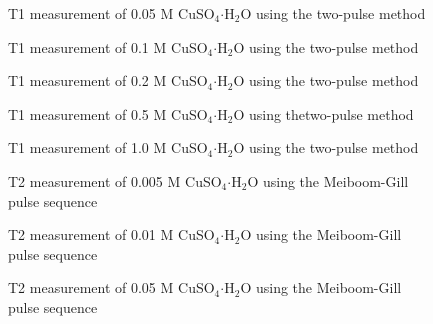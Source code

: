 \documentclass[
reprint,
amsmath,amssymb,
aps,
tikz,
border=5pt
]{revtex4-1}
\begin{document}
\begin{figure}[h]
  \resizebox{0.75\textwidth}{!}{}
  \caption{T1 measurement of 0.05 M  CuSO$_{4} \boldsymbol{\cdot} $H$_2$O using the two-pulse method }
  \label{figAp:0d05_t1}
\end{figure}

\begin{figure}[h]
  \resizebox{0.75\textwidth}{!}{}
  \caption{T1 measurement of 0.1 M  CuSO$_{4} \boldsymbol{\cdot} $H$_2$O using the two-pulse method }
  \label{figAp:0d1_t1}
\end{figure}

\begin{figure}[h]
  \resizebox{0.75\textwidth}{!}{}
  \caption{T1 measurement of 0.2 M  CuSO$_{4} \boldsymbol{\cdot} $H$_2$O using the two-pulse method }
  \label{figAp:0d2_t1}
\end{figure}

\begin{figure}[h]
  \resizebox{0.75\textwidth}{!}{}
  \caption{T1 measurement of 0.5 M  CuSO$_{4} \boldsymbol{\cdot} $H$_2$O using thetwo-pulse method }
  \label{figAp:0d5_t1}
\end{figure}

\begin{figure}[h]
  \resizebox{0.75\textwidth}{!}{}
  \caption{T1 measurement of 1.0 M  CuSO$_{4} \boldsymbol{\cdot} $H$_2$O using the two-pulse method }
  \label{figAp:1d0_t1}
\end{figure}



\begin{figure}[h]
  \resizebox{0.75\textwidth}{!}{}
  \caption{T2 measurement of 0.005 M CuSO$_{4} \boldsymbol{\cdot} $H$_2$O using the Meiboom-Gill pulse sequence }
  \label{figAp:0d005_t2}
\end{figure}

\begin{figure}[h]
  \resizebox{0.75\textwidth}{!}{}
  \caption{T2 measurement of 0.01 M CuSO$_{4} \boldsymbol{\cdot} $H$_2$O using the Meiboom-Gill pulse sequence }
  \label{figAp:0d01_t2}
\end{figure}

\begin{figure}[h]
  \resizebox{0.75\textwidth}{!}{}
  \caption{T2 measurement of 0.05 M CuSO$_{4} \boldsymbol{\cdot} $H$_2$O using the Meiboom-Gill pulse sequence }
  \label{figAp:0d05_t2}
\end{figure}
\end{document}
